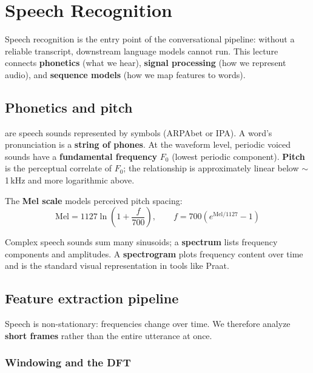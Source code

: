\chapter{Speech Recognition}
\label{ch:speechrec}


Speech recognition is the entry point of the conversational pipeline: without a reliable transcript, downstream language models cannot run. This lecture connects \textbf{phonetics} (what we hear), \textbf{signal processing} (how we represent audio), and \textbf{sequence models} (how we map features to words).

\section{Phonetics and pitch}

 are speech sounds represented by symbols (ARPAbet or IPA). A word's pronunciation is a \textbf{string of phones}. At the waveform level, periodic voiced sounds have a \textbf{fundamental frequency} $F_0$ (lowest periodic component). \textbf{Pitch} is the perceptual correlate of $F_0$; the relationship is approximately linear below $\sim$1\,kHz and more logarithmic above.

The \textbf{Mel scale} models perceived pitch spacing:
\[
\mathrm{Mel} = 1127 \ln\left(1 + \frac{f}{700}\right), \qquad
f = 700\left(e^{\mathrm{Mel}/1127} - 1\right)
\]

Complex speech sounds sum many sinusoids; a \textbf{spectrum} lists frequency components and amplitudes. A \textbf{spectrogram} plots frequency content over time and is the standard visual representation in tools like Praat.

\section{Feature extraction pipeline}

Speech is non-stationary: frequencies change over time. We therefore analyze \textbf{short frames} rather than the entire utterance at once.

\subsection{Windowing and the DFT}

